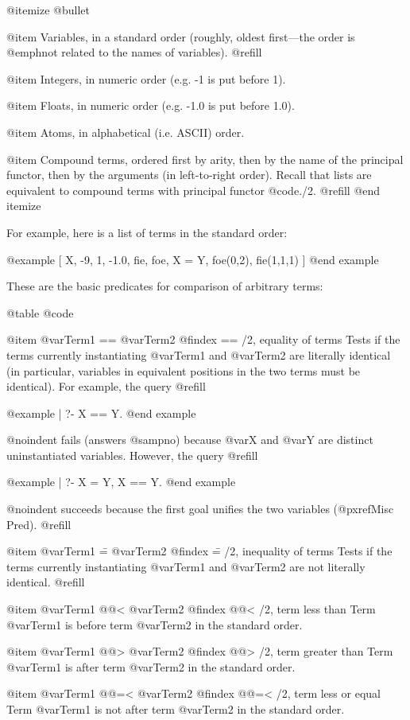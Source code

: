 @itemize @bullet

@item
Variables, in a standard order (roughly, oldest first---the order is
@emph{not} related to the names of variables). @refill

@item
Integers, in numeric order (e.g. -1 is put before 1).

@item
Floats, in numeric order (e.g. -1.0 is put before 1.0).

@item
Atoms, in alphabetical (i.e. ASCII) order.

@item
Compound terms, ordered first by arity, then by the name of the
principal functor, then by the arguments (in left-to-right order).
Recall that lists are equivalent to compound terms with principal
functor @code{./2}. @refill
@end itemize

For example, here is a list of terms in the standard order:

@example
[ X, -9, 1, -1.0, fie, foe, X = Y, foe(0,2), fie(1,1,1) ]
@end example

These are the basic predicates for comparison of arbitrary terms:

@table @code

@item @var{Term1} == @var{Term2}
@findex == /2, equality of terms
Tests if the terms currently instantiating @var{Term1} and @var{Term2} are
literally identical (in particular, variables in equivalent positions in
the two terms must be identical).  For example, the query @refill

@example
| ?- X == Y.
@end example

@noindent
fails (answers @samp{no}) because @var{X} and @var{Y} are distinct
uninstantiated variables.  However, the query @refill

@example
| ?- X = Y, X == Y.
@end example

@noindent
succeeds because the first goal unifies the two variables
(@pxref{Misc Pred}). @refill

@item @var{Term1} \== @var{Term2}
@findex \== /2, inequality of terms
Tests if the terms currently instantiating @var{Term1} and @var{Term2} are not
literally identical. @refill

@item @var{Term1} @@< @var{Term2}
@findex @@< /2, term less than
Term @var{Term1} is before term @var{Term2} in the standard order.

@item @var{Term1} @@> @var{Term2}
@findex @@> /2, term greater than
Term @var{Term1} is after term @var{Term2} in the standard order.

@item @var{Term1} @@=< @var{Term2}
@findex @@=< /2, term less or equal
Term @var{Term1} is not after term @var{Term2} in the standard order.

